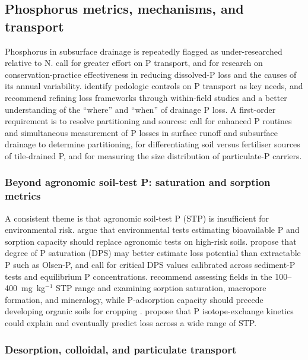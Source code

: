 \documentclass[11pt]{article}
\begin{document}
\subsection{Phosphorus metrics, mechanisms, and transport}

Phosphorus in subsurface drainage is repeatedly flagged as under-researched
relative to N. \textcite{Hertzberger2019} call for greater effort on P transport,
and \textcite{Yuan2022} for research on conservation-practice effectiveness in
reducing dissolved-P loss and the causes of its annual variability.
\textcite{Pease2018} identify pedologic controls on P transport as key needs,
and \textcite{deOliveira2022} recommend refining loss frameworks through
within-field studies and a better understanding of the ``where'' and ``when'' of
drainage P loss. A first-order requirement is to resolve partitioning and
sources: \textcite{King2015} call for enhanced P routines and simultaneous
measurement of P losses in surface runoff and subsurface drainage to determine
partitioning, \textcite{Williams2016} for differentiating soil versus fertiliser
sources of tile-drained P, and \textcite{Qi2018} for measuring the size
distribution of particulate-P carriers.

\subsubsection{Beyond agronomic soil-test P: saturation and sorption metrics}

A consistent theme is that agronomic soil-test P (STP) is insufficient for
environmental risk. \textcite{Sharpley1995} argue that environmental tests
estimating bioavailable P and sorption capacity should replace agronomic tests
on high-risk soils. \textcite{Hooda1999} propose that degree of P saturation
(DPS) may better estimate loss potential than extractable P such as Olsen-P, and
\textcite{Nguyen2002} call for critical DPS values calibrated across sediment-P
tests and equilibrium P concentrations. \textcite{Osterholz2020} recommend
assessing fields in the 100--400~mg~kg$^{-1}$ STP range and examining sorption
saturation, macropore formation, and mineralogy, while P-adsorption capacity
should precede developing organic soils for cropping \parencite{MILLER1979}.
\textcite{McDowell2001} propose that P isotope-exchange kinetics could explain
and eventually predict loss across a wide range of STP.

\subsubsection{Desorption, colloidal, and particulate transport}
\end{document}
